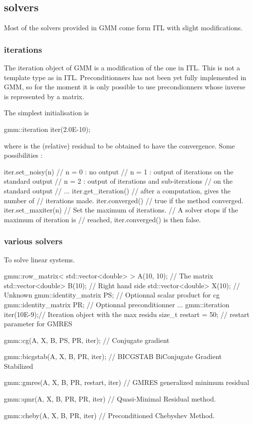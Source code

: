 \documentclass[11pt,a4paper]{article}
\begin{document}
\subsection{solvers}
Most of the solvers provided in GMM come form ITL with slight modifications.

\subsubsection{iterations}
  The iteration object of GMM is a modification of the one in ITL. This is not a template type as in ITL. Preconditionners has not been yet fully implemented in GMM, so for the moment it is only possible to use precondionners whose inverse is represented by a matrix. 

The simplest initialisation is
\begin{cppcode}
  gmm::iteration iter(2.0E-10);
\end{cppcode}
where  is the (relative) residual to be obtained to have the convergence.
Some possibilities :
\begin{cppcode}
  iter.set_noisy(n) // n = 0 : no output
                    // n = 1 : output of iterations on the standard output
                    // n = 2 : output of iterations and sub-iterations 
                    //         on the standard output
                    // ...
  iter.get_iteration() // after a computation, gives the number of
                       // iterations made.
  iter.converged()     // true if the method converged.
  iter.set_maxiter(n)  // Set the maximum of iterations.
                       // A solver stops if the maximum of iteration is 
                       // reached, iter.converged() is then false.
\end{cppcode}

\subsubsection{various solvers}
To solve linear systems.
\begin{cppcode}
  gmm::row_matrix< std::vector<double> > A(10, 10);  // The matrix
  std::vector<double> B(10); // Right hand side
  std::vector<double> X(10); // Unknown
  gmm::identity_matrix PS;   // Optionnal scalar product for cg
  gmm::identity_matrix PR;   // Optionnal preconditionner
  ...
  gmm::iteration iter(10E-9);// Iteration object with the max residu
  size_t restart = 50;       // restart parameter for GMRES
  
  gmm::cg(A, X, B, PS, PR, iter); // Conjugate gradient

  gmm::bicgstab(A, X, B, PR, iter); // BICGSTAB BiConjugate Gradient Stabilized

  gmm::gmres(A, X, B, PR, restart, iter) // GMRES generalized minimum residual

  gmm::qmr(A, X, B, PR, PR, iter) // Quasi-Minimal Residual method.

  gmm::cheby(A, X, B, PR, iter) // Preconditioned Chebyshev Method.
\end{cppcode}
\end{document}
